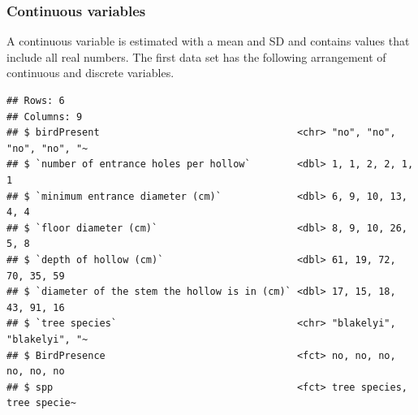 \documentclass[utf8]{frontiersSCNS}
\newenvironment{Shaded}{\begin{snugshade}}{\end{snugshade}}
\newcommand{\CommentTok}[1]{\textcolor[rgb]{0.56,0.35,0.01}{\textit{#1}}}
\newcommand{\DataTypeTok}[1]{\textcolor[rgb]{0.13,0.29,0.53}{#1}}
\newcommand{\DecValTok}[1]{\textcolor[rgb]{0.00,0.00,0.81}{#1}}
\newcommand{\KeywordTok}[1]{\textcolor[rgb]{0.13,0.29,0.53}{\textbf{#1}}}
\newcommand{\NormalTok}[1]{#1}
\newcommand{\OperatorTok}[1]{\textcolor[rgb]{0.81,0.36,0.00}{\textbf{#1}}}
\newcommand{\StringTok}[1]{\textcolor[rgb]{0.31,0.60,0.02}{#1}}
\begin{document}
\hypertarget{continuous-variables}{%
\subsubsection{Continuous variables}\label{continuous-variables}}

A continuous variable is estimated with a mean and SD and contains
values that include all real numbers. The first data set has the
following arrangement of continuous and discrete variables.

\begin{Shaded}
\end{Shaded}

\begin{verbatim}
## Rows: 6
## Columns: 9
## $ birdPresent                                  <chr> "no", "no", "no", "no", "~
## $ `number of entrance holes per hollow`        <dbl> 1, 1, 2, 2, 1, 1
## $ `minimum entrance diameter (cm)`             <dbl> 6, 9, 10, 13, 4, 4
## $ `floor diameter (cm)`                        <dbl> 8, 9, 10, 26, 5, 8
## $ `depth of hollow (cm)`                       <dbl> 61, 19, 72, 70, 35, 59
## $ `diameter of the stem the hollow is in (cm)` <dbl> 17, 15, 18, 43, 91, 16
## $ `tree species`                               <chr> "blakelyi", "blakelyi", "~
## $ BirdPresence                                 <fct> no, no, no, no, no, no
## $ spp                                          <fct> tree species, tree specie~
\end{verbatim}
\end{document}
